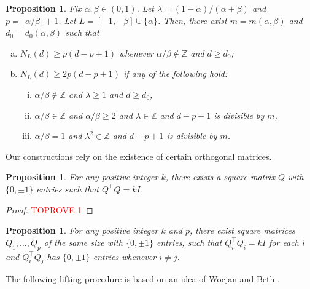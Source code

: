 \documentclass[reqno, 11pt]{amsart}
\newtheorem{proposition}[theorem]{Proposition}
\theoremstyle{definition}
\theoremstyle{remark}
\newcommand{\ZZ}{\mathbb{Z}}
\begin{document}
\begin{proposition}\label{prop:lower}
    Fix $\alpha, \beta \in (0,1)$. Let $\lambda = (1-\alpha)/(\alpha + \beta)$ and $p = \lfloor \alpha/\beta \rfloor + 1$. Let $L = [-1,-\beta]\cup \{\alpha\}$. Then, there exist $m = m(\alpha, \beta)$ and $d_0 = d_0(\alpha, \beta)$ such that
    \begin{enumerate}[(a)]
        \item \label{itm:lower-nint-p} $N_L(d) \geq p(d-p+1)$ whenever $\alpha/\beta \notin \ZZ$ and $d \geq d_0$; 
        \item \label{itm:lower-2p}  $N_L(d) \geq 2p(d-p+1)$ if any of the following hold: 
        \begin{enumerate}[(i)]
            \item \label{itm:lower-nint-2p} $\alpha/\beta \notin \ZZ$ and $\lambda \geq 1$ and $d \geq d_0$,
            \item \label{itm:lower-int-2p}  $\alpha/\beta \in \ZZ$ and $\alpha/\beta \geq 2$ and $\lambda \in \ZZ$ and $d-p+1$ is divisible by $m$,
            \item \label{itm:lower-4} $\alpha/\beta = 1$ and $\lambda^2 \in \ZZ$ and $d-p+1$ is divisible by $m$.
        \end{enumerate}
    \end{enumerate}
\end{proposition}

Our constructions rely on the existence of certain orthogonal matrices.

\begin{proposition}\label{prop:matrix}
    For any positive integer $k$, there exists a square matrix $Q$ with $\{0, \pm 1\}$ entries such that $Q^\intercal Q = k I$. 
\end{proposition}

\begin{proof}\textcolor{red}{TOPROVE 1}\end{proof}

\begin{proposition}\label{prop:matrix-copies}
    For any positive integer $k$ and $p$, there exist square matrices $Q_1, \ldots, Q_p$ of the same size with $\{0, \pm 1\}$ entries, such that $Q_i^\intercal Q_i = k I$ for each $i$ and $Q_i^\intercal Q_j$ has $\{0, \pm 1\}$ entries whenever $i \neq j$.
\end{proposition}


The following lifting procedure is based on an idea of Wocjan and Beth \cite{WB05}. 
\end{document}
